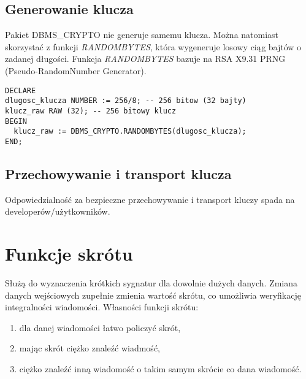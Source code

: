 \documentclass[12pt, a4paper]{article}
\begin{document}
\subsection{Generowanie klucza}
Pakiet DBMS\_CRYPTO nie generuje samemu klucza. Można natomiast
skorzystać z funkcji \emph{RANDOMBYTES}, która wygeneruje losowy ciąg
bajtów o zadanej długości. Funkcja \emph{RANDOMBYTES} bazuje na RSA
X9.31 PRNG (Pseudo-RandomNumber Generator).
% 

\begin{lstlisting}
DECLARE
dlugosc_klucza NUMBER := 256/8; -- 256 bitow (32 bajty)
klucz_raw RAW (32); -- 256 bitowy klucz
BEGIN
  klucz_raw := DBMS_CRYPTO.RANDOMBYTES(dlugosc_klucza);
END;
\end{lstlisting}

\subsection{Przechowywanie  i transport klucza}
Odpowiedzialność za bezpieczne przechowywanie i transport kluczy spada na developerów/użytkowników.

\section{Funkcje skrótu}
Służą do wyznaczenia krótkich sygnatur dla dowolnie dużych danych. 
Zmiana danych wejściowych zupełnie zmienia wartość skrótu, co umożliwia weryfikację integralności wiadomości.
\newline \newline
Własności funkcji skrótu:
\begin{enumerate}
  \item dla danej wiadomości łatwo policzyć skrót,
  \item mając skrót ciężko znaleźć wiadmość,
  \item ciężko znaleźć inną wiadomość o takim samym skrócie co dana wiadomość.
\end{enumerate}
\end{document}
